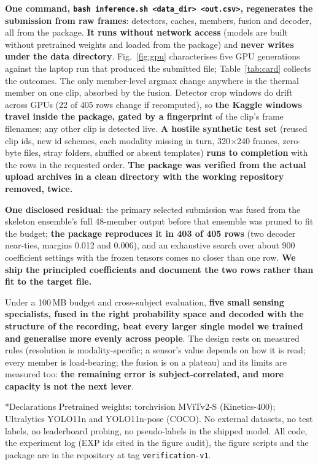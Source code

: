 \documentclass[conference]{IEEEtran}
\makeatletter
\def\section{\Needspace*{7\baselineskip}\@startsection{section}{1}{\z@}{9pt}{4pt}{\normalfont\fontsize{12}{14}\selectfont\bfseries\color{ink}}}
\makeatother
\begin{document}
\textbf{One command, \texttt{bash inference.sh <data\_dir> <out.csv>}, regenerates the submission from raw frames}: detectors, caches, members, fusion and decoder, all from the package. \textbf{It runs without network access} (models are built without pretrained weights and loaded from the package) and \textbf{never writes under the data directory}. Fig.~\ref{fig:gpu} characterises five GPU generations against the laptop run that produced the submitted file; Table~\ref{tab:card} collects the outcomes. The only member-level argmax change anywhere is the thermal member on one clip, absorbed by the fusion. Detector crop windows do drift across GPUs (22 of 405 rows change if recomputed), so \textbf{the Kaggle windows travel inside the package, gated by a fingerprint} of the clip's frame filenames; any other clip is detected live. \textbf{A hostile synthetic test set} (reused clip ids, new id schemes, each modality missing in turn, 320$\times$240 frames, zero-byte files, stray folders, shuffled or absent templates) \textbf{runs to completion} with the rows in the requested order. \textbf{The package was verified from the actual upload archives in a clean directory with the working repository removed, twice.}

\textbf{One disclosed residual}: the primary selected submission was fused from the skeleton ensemble's full 48-member output before that ensemble was pruned to fit the budget; \textbf{the package reproduces it in 403 of 405 rows} (two decoder near-ties, margins 0.012 and 0.006), and an exhaustive search over about 900 coefficient settings with the frozen tensors comes no closer than one row. \textbf{We ship the principled coefficients and document the two rows rather than fit to the target file.}


\section{Conclusion}
Under a 100\,MB budget and cross-subject evaluation, \textbf{five small sensing specialists, fused in the right probability space and decoded with the structure of the recording, beat every larger single model we trained and generalise more evenly across people}. The design rests on measured rules (resolution is modality-specific; a sensor's value depends on how it is read; every member is load-bearing; the fusion is on a plateau) and its limits are measured too: \textbf{the remaining error is subject-correlated, and more capacity is not the next lever}.

\section*{Declarations}
Pretrained weights: torchvision MViTv2-S (Kinetics-400); Ultralytics YOLO11n and YOLO11n-pose (COCO). No external datasets, no test labels, no leaderboard probing, no pseudo-labels in the shipped model. All code, the experiment log (EXP ids cited in the figure audit), the figure scripts and the package are in the repository at tag \texttt{verification-v1}.
\end{document}
